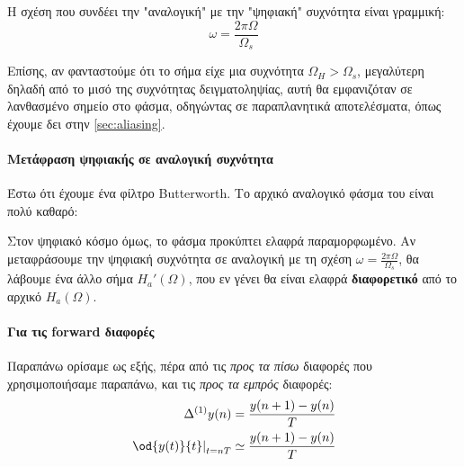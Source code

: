 \documentclass[11pt,a4paper,notitlepage,fleqn]{article}
\begin{document}
Η σχέση που συνδέει την "αναλογική" με την "ψηφιακή" συχνότητα είναι γραμμική:
\[
\boxed{\omega = \frac{2πΩ}{Ω_s}}
\]

Επίσης, αν φανταστούμε ότι το σήμα είχε μια συχνότητα \( Ω_H > \Omega_s \), μεγαλύτερη δηλαδή από το
μισό της συχνότητας δειγματοληψίας, αυτή θα εμφανιζόταν σε λανθασμένο σημείο στο φάσμα, οδηγώντας
σε παραπλανητικά αποτελέσματα, όπως έχουμε δει στην \autoref{sec:aliasing}.

\paragraph{Μετάφραση ψηφιακής σε αναλογική συχνότητα}
Έστω ότι έχουμε ένα φίλτρο Butterworth. Το αρχικό αναλογικό φάσμα του είναι πολύ καθαρό:



Στον ψηφιακό κόσμο όμως, το φάσμα προκύπτει ελαφρά παραμορφωμένο. Αν μεταφράσουμε την ψηφιακή συχνότητα
σε αναλογική με τη σχέση \( ω = \frac{2πΩ}{Ω_s} \), θα λάβουμε ένα άλλο σήμα \( H_a'(Ω) \),
που εν γένει θα είναι ελαφρά \textbf{διαφορετικό} από το αρχικό \( H_a(Ω) \).

\paragraph{Για τις forward διαφορές}
Παραπάνω ορίσαμε ως εξής, πέρα από τις \emph{προς τα πίσω} διαφορές που χρησιμοποιήσαμε παραπάνω,
και τις \emph{προς τα εμπρός} διαφορές:
\begin{align*}
\Delta^{(1)} y(n) &= \frac{y(n+1)-y(n)}{T} \\
\left. \od{y(t)}{t} \right|_{t=nT} &\simeq \frac{y(n+1)-y(n)}{T}
\end{align*}
\end{document}
